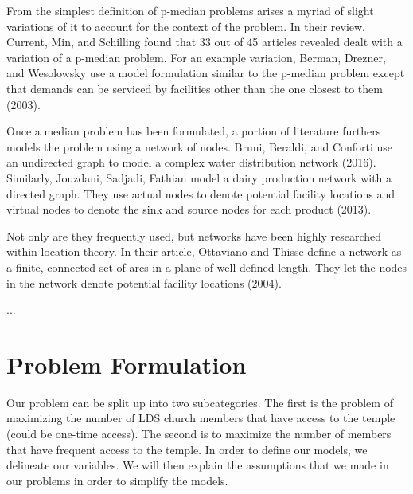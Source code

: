 \documentclass[twoside,twocolumn]{article}
\begin{document}
From the simplest definition of p-median problems arises a myriad of slight variations of it to account for the context of the problem.
In their review, Current, Min, and Schilling found that 33 out of 45 articles revealed dealt with a variation of a p-median problem.
For an example variation, Berman, Drezner, and Wesolowsky use a model formulation similar to the p-median problem except that demands can be serviced by facilities other than the one closest to them (2003).

Once a median problem has been formulated, a portion of literature furthers models the problem using a network of nodes.
Bruni, Beraldi, and Conforti use an undirected graph to model a complex water distribution network (2016).
Similarly, Jouzdani, Sadjadi, Fathian model a dairy production network with a directed graph.
They use actual nodes to denote potential facility locations and virtual nodes to denote the sink and source nodes for each product (2013).

Not only are they frequently used, but networks have been highly researched within location theory.
In their article, Ottaviano and Thisse define a network as a finite, connected set of arcs in a plane of well-defined length.
They let the nodes in the network denote potential facility locations (2004).

...

\section{Problem Formulation}
\label{sec:prob}

Our problem can be split up into two subcategories. 
The first is the problem of maximizing the number of LDS church members that have access to the temple (could be one-time access).
The second is to maximize the number of members that have frequent access to the temple.
In order to define our models, we delineate our variables.
We will then explain the assumptions that we made in our problems in order to simplify the models.
\end{document}
